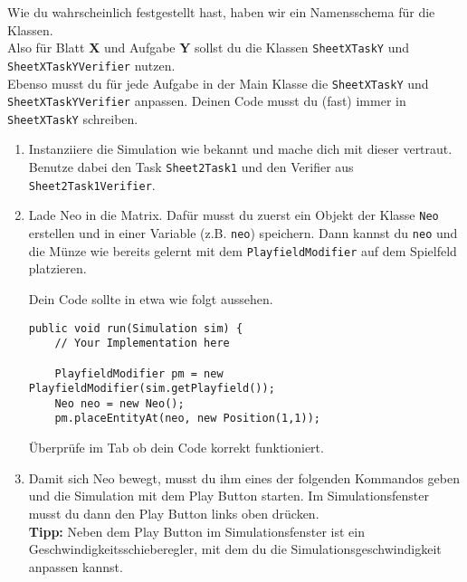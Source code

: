 


\begin{Infobox}
    Wie du wahrscheinlich festgestellt hast, haben wir ein Namensschema für die Klassen.\\
    Also für Blatt \textbf{X} und Aufgabe \textbf{Y} sollst du die Klassen \lstinline{SheetXTaskY} und \lstinline{SheetXTaskYVerifier} nutzen.\\
    Ebenso musst du für jede Aufgabe in der Main Klasse die \lstinline{SheetXTaskY} und \lstinline{SheetXTaskYVerifier} anpassen.
    Deinen Code musst du (fast) immer in \lstinline{SheetXTaskY} schreiben.
\end{Infobox}

\begin{enumerate}
    \item Instanziiere die Simulation wie bekannt und mache dich mit dieser vertraut. 
        Benutze dabei den Task \lstinline{Sheet2Task1} und den Verifier aus \lstinline{Sheet2Task1Verifier}.
    \item Lade Neo in die Matrix.
        Dafür musst du zuerst ein Objekt der Klasse \lstinline{Neo} erstellen und in einer Variable (z.B. \lstinline{neo}) speichern.
        Dann kannst du \lstinline{neo} und die Münze wie bereits gelernt mit dem \lstinline{PlayfieldModifier} auf dem Spielfeld platzieren.

        Dein Code sollte in etwa wie folgt aussehen.

        \begin{lstlisting}[firstnumber=14]
public void run(Simulation sim) {
    // Your Implementation here

    PlayfieldModifier pm = new PlayfieldModifier(sim.getPlayfield());
    Neo neo = new Neo();
    pm.placeEntityAt(neo, new Position(1,1));
        \end{lstlisting}

        Überprüfe im  Tab ob dein Code korrekt funktioniert.
    \item Damit sich Neo bewegt, musst du ihm eines der folgenden Kommandos geben und die Simulation mit dem Play Button starten. Im Simulationsfenster musst du dann den Play Button links oben drücken. \\
    \textbf{Tipp:} Neben dem Play Button im Simulationsfenster ist ein Geschwindigkeitsschieberegler, mit dem du die Simulationsgeschwindigkeit anpassen kannst.


\end{enumerate}
